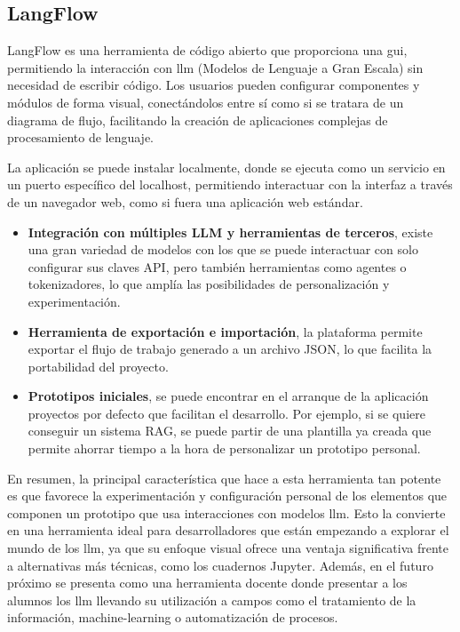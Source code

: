 	\subsection{LangFlow}
	LangFlow es una herramienta de código abierto\cite{langflow} que proporciona una \acrfull{gui}, permitiendo la interacción con \acrlong{llm} (Modelos de Lenguaje a Gran Escala) sin necesidad de escribir código. Los usuarios pueden configurar componentes y módulos de forma visual, conectándolos entre sí como si se tratara de un diagrama de flujo, facilitando la creación de aplicaciones complejas de procesamiento de lenguaje.
	
	La aplicación se puede instalar localmente, donde se ejecuta como un servicio en un puerto específico del localhost, permitiendo interactuar con la interfaz a través de un navegador web, como si fuera una aplicación web estándar.
	\begin{itemize}
		
		\item \textbf{Integración con múltiples LLM y herramientas de terceros}, existe una gran variedad de modelos con los que se puede interactuar con solo configurar sus claves API, pero también herramientas como agentes o tokenizadores, lo que amplía las posibilidades de personalización y experimentación.
		
		\item \textbf{Herramienta de exportación e importación}, la plataforma permite exportar el flujo de trabajo generado a un archivo JSON, lo que facilita la portabilidad del proyecto.
		
		\item \textbf{Prototipos iniciales}, se puede encontrar en el arranque de la aplicación proyectos por defecto que facilitan el desarrollo. Por ejemplo, si se quiere conseguir un sistema RAG, se puede partir de una plantilla ya creada que permite ahorrar tiempo a la hora de personalizar un prototipo personal.
	
	\end{itemize}
	En resumen, la principal característica que hace a esta herramienta tan potente es que favorece la experimentación y configuración personal de los elementos que componen un prototipo que usa interacciones con modelos \acrshort{llm}. Esto la convierte en una herramienta ideal para desarrolladores que están empezando a explorar el mundo de los \acrshort{llm}, ya que su enfoque visual ofrece una ventaja significativa frente a alternativas más técnicas, como los cuadernos Jupyter. Además, en el futuro próximo se presenta como una herramienta docente donde presentar a los alumnos los \acrlong{llm} llevando su utilización a campos como el tratamiento de la información, machine-learning o automatización de procesos.

